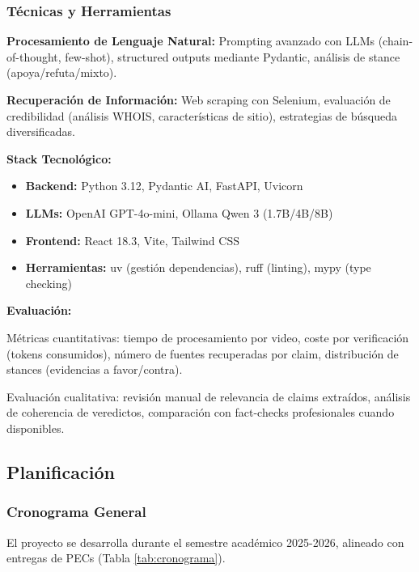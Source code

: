 \documentclass[12pt,a4paper,twoside]{book}
\begin{document}
\subsubsection{Técnicas y Herramientas}

\textbf{Procesamiento de Lenguaje Natural:} Prompting avanzado con LLMs (chain-of-thought, few-shot), structured outputs mediante Pydantic, análisis de stance (apoya/refuta/mixto).

\textbf{Recuperación de Información:} Web scraping con Selenium, evaluación de credibilidad (análisis WHOIS, características de sitio), estrategias de búsqueda diversificadas.

\textbf{Stack Tecnológico:}
\begin{itemize}
    \item \textbf{Backend:} Python 3.12, Pydantic AI, FastAPI, Uvicorn
    \item \textbf{LLMs:} OpenAI GPT-4o-mini, Ollama Qwen 3 (1.7B/4B/8B)
    \item \textbf{Frontend:} React 18.3, Vite, Tailwind CSS
    \item \textbf{Herramientas:} uv (gestión dependencias), ruff (linting), mypy (type checking)
\end{itemize}

\textbf{Evaluación:}

Métricas cuantitativas: tiempo de procesamiento por video, coste por verificación (tokens consumidos), número de fuentes recuperadas por claim, distribución de stances (evidencias a favor/contra).

Evaluación cualitativa: revisión manual de relevancia de claims extraídos, análisis de coherencia de veredictos, comparación con fact-checks profesionales cuando disponibles.

\subsection{Planificación}

\subsubsection{Cronograma General}

El proyecto se desarrolla durante el semestre académico 2025-2026, alineado con entregas de PECs (Tabla \ref{tab:cronograma}).
\end{document}
